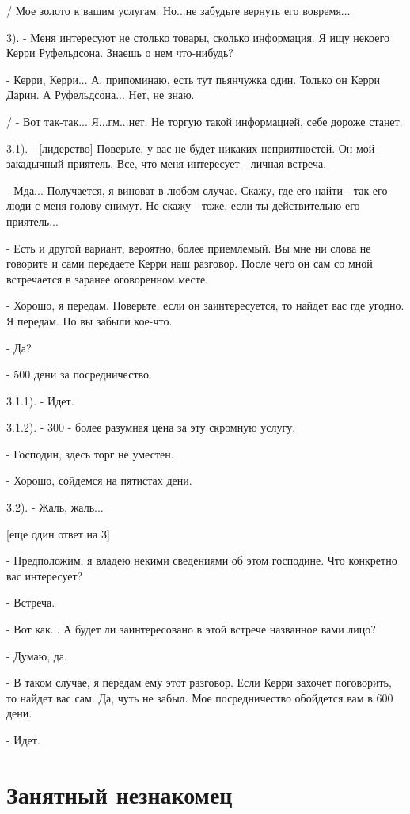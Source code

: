 \documentclass[12pt,a4paper]{book}
\begin{document}
/ Мое золото к вашим услугам. Но...не забудьте вернуть его вовремя...

3). - Меня интересуют не столько товары, сколько информация. Я ищу некоего Керри Руфельдсона. Знаешь о нем что-нибудь?

- Керри, Керри... А, припоминаю, есть тут пьянчужка один. Только он Керри Дарин. А Руфельдсона... Нет, не знаю.

/ - Вот так-так... Я...гм...нет. Не торгую такой информацией, себе дороже станет.

3.1). - [лидерство] Поверьте, у вас не будет никаких неприятностей. Он мой закадычный приятель. Все, что меня интересует - личная встреча.

- Мда... Получается, я виноват в любом случае. Скажу, где его найти - так его люди с меня голову снимут. Не скажу - тоже, если ты действительно его приятель...

- Есть и другой вариант, вероятно, более приемлемый. Вы мне ни слова не говорите и сами передаете Керри наш разговор. После чего он сам со мной встречается в заранее оговоренном месте.

- Хорошо, я передам. Поверьте, если он заинтересуется, то найдет вас где угодно. Я передам. Но вы забыли кое-что.

- Да?

- 500 дени за посредничество.

3.1.1). - Идет.

3.1.2). - 300 - более разумная цена за эту скромную услугу.

- Господин, здесь торг не уместен.

- Хорошо, сойдемся на пятистах дени.

3.2). - Жаль, жаль...

[еще один ответ на 3]

- Предположим, я владею некими сведениями об этом господине. Что конкретно вас интересует?

- Встреча.

- Вот как... А будет ли заинтересовано в этой встрече названное вами лицо?

- Думаю, да.

- В таком случае, я передам ему этот разговор. Если Керри захочет поговорить, то найдет вас сам. Да, чуть не забыл. Мое посредничество обойдется вам в 600 дени.

- Идет.

\section{Занятный незнакомец}
\end{document}
